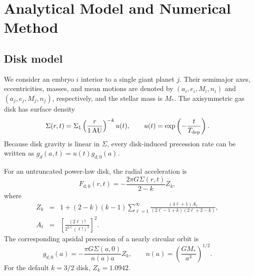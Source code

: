 \section{Analytical Model and Numerical Method}

\subsection{Disk model}

We consider an embryo $i$ interior to a single giant planet $j$. Their
semimajor axes, eccentricities, masses, and mean motions are denoted by
$(a_i,e_i,M_i,n_i)$ and $(a_j,e_j,M_j,n_j)$, respectively, and the stellar
mass is $M_*$. The axisymmetric gas disk has surface density
\begin{equation}
    \Sigma(r,t)=\Sigma_1
    \left(\frac{r}{1\,\mathrm{AU}}\right)^{-k}u(t),
    \qquad
    u(t)=\exp\left(-\frac{t}{T_{\rm dep}}\right).
\label{eq:sigma_analytical}
\end{equation}
Because disk gravity is linear in $\Sigma$, every disk-induced precession
rate can be written as $g_d(a,t)=u(t)g_{d,0}(a)$.

For an untruncated power-law disk, the radial acceleration is
\begin{equation}
    F_{d,0}(r,t)=-\frac{2\pi G\Sigma(r,t)}{2-k}Z_k,
\label{eq:full_disk_force}
\end{equation}
where
\begin{eqnarray}
    Z_k &=& 1+(2-k)(k-1)
    \sum_{\ell=1}^{\infty}
    \frac{(4\ell+1)A_\ell}
    {(2\ell-1+k)(2\ell+2-k)},
    \nonumber\\
    A_\ell&=&
    \left[\frac{(2\ell)!}{2^{2\ell}(\ell!)^2}\right]^2.
\label{eq:zk_coefficients}
\end{eqnarray}
The corresponding apsidal precession of a nearly circular orbit is
\begin{equation}
    g_{d,0}(a)=-\frac{\pi G\Sigma(a,0)}{n(a)a}Z_k,
    \qquad
    n(a)=\left(\frac{GM_*}{a^3}\right)^{1/2}.
\label{eq:full_disk_precession}
\end{equation}
For the default $k=3/2$ disk, $Z_k=1.0942$.

